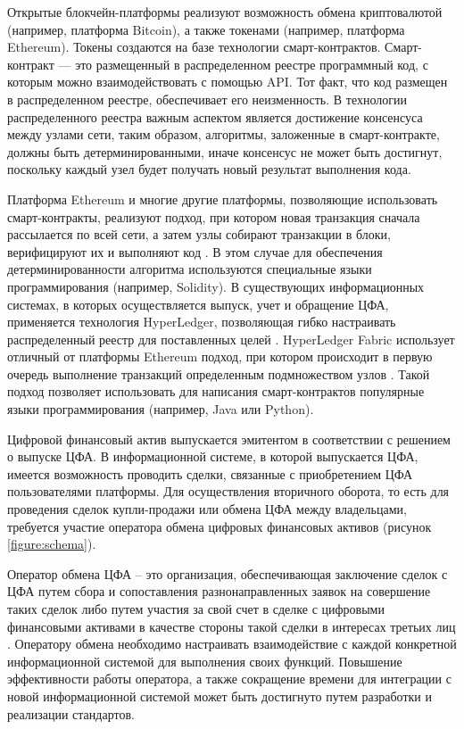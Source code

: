 \documentclass[a4paper, 10pt]{article}
\begin{document}
	Открытые блокчейн-платформы реализуют возможность обмена криптовалютой (например, платформа Bitcoin), а также токенами (например, платформа Ethereum). Токены создаются на базе технологии смарт-контрактов. Смарт-контракт — это размещенный в распределенном реестре программный код, с которым можно взаимодействовать с помощью API. Тот факт, что код размещен в распределенном реестре, обеспечивает его неизменность. В технологии распределенного реестра важным аспектом является достижение консенсуса между узлами сети, таким образом, алгоритмы, заложенные в смарт-контракте, должны быть детерминированными, иначе консенсус не может быть достигнут, поскольку каждый узел будет получать новый результат выполнения кода. 
	
	Платформа Ethereum и многие другие платформы, позволяющие использовать смарт-контракты, реализуют подход, при котором новая транзакция сначала рассылается по всей сети, а затем узлы собирают транзакции в блоки, верифицируют их и выполняют код \cite{ru:eth}. В этом случае для обеспечения детерминированности алгоритма используются специальные языки программирования (например, Solidity). В существующих информационных системах, в которых осуществляется выпуск, учет и обращение ЦФА, применяется технология HyperLedger, позволяющая гибко настраивать распределенный реестр для поставленных целей \cite{ru:atomyze, ru:rules}. HyperLedger Fabric использует отличный от платформы Ethereum подход, при котором происходит в первую очередь выполнение транзакций определенным подмножеством узлов \cite{ru:hyperledger}. Такой подход позволяет использовать для написания смарт-контрактов популярные языки программирования (например, Java или Python).
	
	Цифровой финансовый актив выпускается эмитентом в соответствии с решением о выпуске ЦФА. В информационной системе, в которой выпускается ЦФА, имеется возможность проводить сделки, связанные с приобретением ЦФА пользователями платформы. Для осуществления вторичного оборота, то есть для проведения сделок купли-продажи или обмена ЦФА между владельцами, требуется участие оператора обмена цифровых финансовых активов (рисунок  \ref{figure:schema}). 
	
	Оператор обмена ЦФА – это организация, обеспечивающая заключение сделок с ЦФА путем сбора и сопоставления разнонаправленных заявок на совершение таких сделок либо путем участия за свой счет в сделке с цифровыми финансовыми активами в качестве стороны такой сделки в интересах третьих лиц \cite{ru:fz-259}. Оператору обмена необходимо настраивать взаимодействие с каждой конкретной информационной системой для выполнения своих функций. Повышение эффективности работы оператора, а также сокращение времени для интеграции с новой информационной системой может быть достигнуто путем разработки и реализации стандартов. 
	
\end{document}
